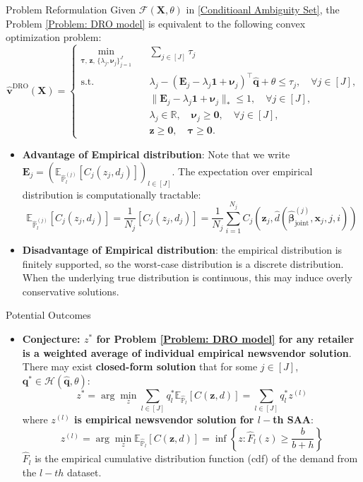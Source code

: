 \documentclass{beamer}
\newcommand{\mb}[1]{{\mathbf{#1}}}
\newcommand{\txrd}[1]{{\textcolor{sintefred}{\textbf{#1}}}}
\newcommand{\bbp}{\mathbb{P}}
\begin{document}
\begin{frame}{Problem Reformulation}
Given $\mathcal{F}(\mb X, \theta)$ in \eqref{Conditioanl Ambiguity Set},
the Problem \eqref{Problem: DRO model} is equivalent to the following convex optimization problem:
\begin{equation}
\hat{\bm v}^{\mathrm{DRO}}(\mb X)
=
\left\{
\begin{aligned}
\min_{\bm\tau,\, \bm z,\, \{\lambda_j, \bm\nu_j\}_{j=1}^J} \quad
& \sum_{j \in [J]} \tau_j \\
\text{s.t.} \quad
& \lambda_j
- (\mb E_j - \lambda_j \bm 1 + \bm\nu_j)^\top \hat{\bm q}
+ \theta
\le \tau_j,
\quad \forall j \in [J], \\
& \|\mb E_j - \lambda_j \bm 1 + \bm\nu_j\|_* \le 1,
\quad \forall j \in [J], \\
& \lambda_j \in \mathbb{R}, \quad \bm\nu_j \ge \bm 0,
\quad \forall j \in [J], \\
& \bm z \ge \bm 0, \quad \bm\tau \ge \bm 0 .
\end{aligned}
\right.
\label{Problem:SummationDRO}
\end{equation}

\begin{itemize}
    \item \txrd{Advantage of Empirical distribution}: Note that we write  $ \mb E_j =(\mathbb{E}_{\hat{\bbp}^{(j)}_l}[C_j (z_j,  d_j)])_{l\in [J]}$. The expectation over empirical distribution is computationally tractable:
    \[
    \mathbb{E}_{\hat{\bbp}^{(j)}_l}[C_j (z_j,  d_j)] = \frac{1}{N_j}[C_j (z_j,  d_j)] = \frac{1}{N_j} \sum_{i = 1}^{N_j} 
    C_j \left( \bm z_j, \hat{d}(\hat{\bm \beta}_{\text{joint}}^{(j)}, \bm x_j, j, i) \right)
    \] 
    \item \txrd{Disadvantage of Empirical distribution}: the empirical distribution is finitely supported, so the worst-case distribution is a discrete distribution. When the underlying true distribution is continuous, this may induce overly conservative solutions.
\end{itemize}

\end{frame}


\begin{frame}{Potential Outcomes}

\begin{itemize}
    \item \txrd{Conjecture: $z^*$ for Problem \eqref{Problem: DRO model} for any retailer is a weighted average of individual empirical newsvendor solution}. 
    There may exist \txrd{closed-form solution} that for some $j \in [J]$, $\bm q^* \in \mathcal{H}(\hat{\bm q}, \theta)$:
    \[
    z^* = \arg \min_z \sum_{l \in [J]} {q}_l^* \mathbb{E}_{\hat{\bbp}_l}[C (\bm z, d)] = \sum_{l \in [J]} {q}_l^* z^{(l)}
    \]
    where \txrd{$z^{(l)}$ is empirical newsvendor solution for $l-$th SAA}:
    \[
    z^{(l)} = \arg \min_z \mathbb{E}_{\hat{\bbp}_l}[C (\bm z, d)] 
     = \inf\left\{z:\hat{F}_{l}(z)\geq\frac{b}{b+h}\right\}
    \]
    $\hat{F}_{l}$ is the empirical cumulative distribution
    function (cdf) of the demand from the $l-th$ dataset.
\end{itemize}


\end{frame}
\end{document}
